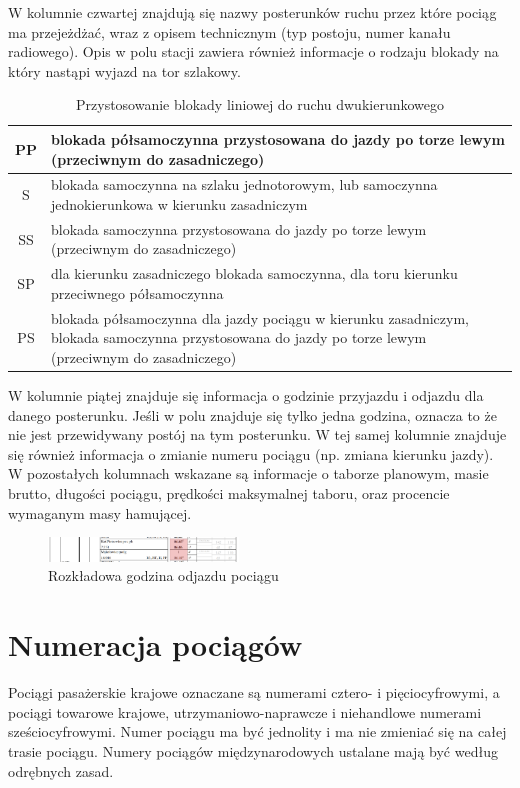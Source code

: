 W kolumnie czwartej znajdują się nazwy posterunków ruchu przez które pociąg ma przejeżdżać, wraz z opisem technicznym (typ postoju, numer kanału radiowego). Opis w polu stacji zawiera również informacje o rodzaju blokady na który nastąpi wyjazd na tor szlakowy. 
\begin{table}
	\begin{tabular}{|c|m{11cm}|}   
		\hline
		PP	& blokada półsamoczynna przystosowana do jazdy po torze lewym (przeciwnym do zasadniczego) \\ 
		\hline
		S	& blokada samoczynna na szlaku jednotorowym, lub samoczynna jednokierunkowa w kierunku zasadniczym \\ 
		\hline
		SS	& blokada samoczynna przystosowana do jazdy po torze lewym (przeciwnym do zasadniczego) \\ 
		\hline
		SP	& dla kierunku zasadniczego blokada samoczynna, dla toru kierunku przeciwnego półsamoczynna \\ 
		\hline
		PS	& blokada półsamoczynna dla jazdy pociągu w kierunku zasadniczym, blokada samoczynna przystosowana do jazdy po torze lewym (przeciwnym do zasadniczego) \\ 
		\hline
	\end{tabular} 
	\caption{Przystosowanie blokady liniowej do ruchu dwukierunkowego}
\end{table}
W kolumnie piątej znajduje się informacja o godzinie przyjazdu i odjazdu dla danego posterunku. Jeśli w polu znajduje się tylko jedna godzina, oznacza to że nie jest przewidywany postój na tym posterunku. W tej samej kolumnie znajduje się również informacja o zmianie numeru pociągu (np. zmiana kierunku jazdy). W pozostałych kolumnach wskazane są informacje o taborze planowym, masie brutto, długości pociągu, prędkości maksymalnej taboru, oraz procencie wymaganym masy hamującej.
\begin{figure}
	\includegraphics[width=0.45\textwidth]{skryptkierownik-img/rozklad-odjaz.png}
	\caption{Rozkładowa godzina odjazdu pociągu}
\end{figure}


\section{Numeracja pociągów}

Pociągi pasa­żerskie krajowe ozna­czane są nume­rami cztero- i pięcio­cyfro­wymi, a pociągi towa­rowe krajowe, utrzymaniowo-naprawcze i niehan­dlowe nume­rami sześcio­cyfro­wymi. Numer pociągu ma być jedno­lity i ma nie zmieniać się na całej trasie pociągu. Numery pociągów międzynaro­dowych usta­lane mają być według odrębnych zasad.

